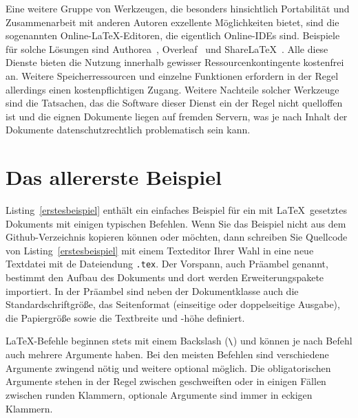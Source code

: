 \documentclass[a4paper,10pt,twoside]{scrbook}
\begin{document}
Eine weitere Gruppe von Werkzeugen, die besonders hinsichtlich Portabilität und Zusammenarbeit mit anderen Autoren exzellente Möglichkeiten bietet, sind die sogenannten Online-\LaTeX-Editoren, die eigentlich Online-IDEs sind. Beispiele für solche Lösungen sind Authorea~\cite{AuthoreaWebseite}, Overleaf~\cite{OverleafWebseite} und ShareLaTeX~\cite{ShareLaTeXWebseite}. Alle diese Dienste bieten die Nutzung innerhalb gewisser Ressourcenkontingente kostenfrei an. Weitere Speicherressourcen und einzelne Funktionen erfordern in der Regel allerdings einen kostenpflichtigen Zugang. Weitere Nachteile solcher Werkzeuge sind die Tatsachen, das die Software dieser Dienst ein der Regel nicht quelloffen ist und die eignen Dokumente liegen auf fremden Servern, was je nach Inhalt der Dokumente datenschutzrechtlich problematisch sein kann.








\section{Das allererste Beispiel}

Listing~\ref{erstesbeispiel} enthält ein einfaches Beispiel für ein mit \LaTeX\ gesetztes Dokuments mit einigen typischen Befehlen. Wenn Sie das Beispiel nicht aus dem Github-Verzeichnis kopieren können oder möchten, dann schreiben Sie Quellcode von Listing~\ref{erstesbeispiel} mit einem Texteditor Ihrer Wahl in eine neue Textdatei mit de Dateiendung \verb!.tex!. Der Vorspann, auch Präambel genannt, bestimmt den Aufbau des Dokuments und dort werden Erweiterungspakete importiert. In der Präambel sind neben der Dokumentklasse auch die Standardschriftgröße, das Seitenformat (einseitige oder doppelseitige Ausgabe), die Papiergröße sowie die Textbreite und -höhe definiert.








LaTeX-Befehle\label{Seite_Befehl} beginnen stets mit einem Backslash (\verb!\!) und können je nach Befehl auch mehrere Argumente haben. Bei den meisten Befehlen sind verschiedene Argumente zwingend nötig und weitere optional möglich. Die obligatorischen Argumente stehen in der Regel zwischen geschweiften oder in einigen Fällen zwischen runden Klammern, optionale Argumente sind immer in eckigen Klammern.
\end{document}
